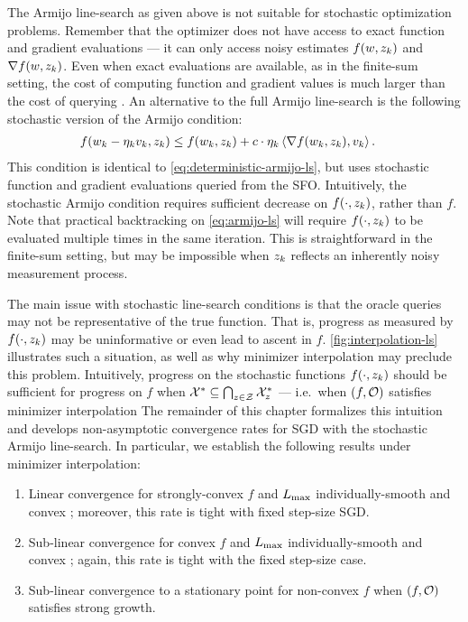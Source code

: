 The Armijo line-search as given above is not suitable for stochastic optimization problems.
Remember that the optimizer does not have access to exact function and gradient evaluations --- it can only access noisy estimates \( f(\w, \zk) \) and \( \grad(\w, \zk) \).
Even when exact evaluations are available, as in the finite-sum setting, the cost of computing function and gradient values is much larger than the cost of querying \oracle{}. 
An alternative to the full Armijo line-search is the following stochastic version of the Armijo condition:
\begin{align}
    f(\wk - \etak v_k, \zk) &\leq f(\wk, \zk) + c \cdot \etak \abr{\grad(\wk, \zk), v_k}. \label{eq:armijo-ls}
\end{align}
This condition is identical to \autoref{eq:deterministic-armijo-ls}, but uses stochastic function and gradient evaluations queried from the \ac{SFO}.
Intuitively, the stochastic Armijo condition requires sufficient decrease on \( f(\cdot, \zk) \), rather than \( f \).
Note that practical backtracking on \autoref{eq:armijo-ls} will require \( f(\cdot, \zk) \) to be evaluated multiple times in the same iteration.
This is straightforward in the finite-sum setting, but may be impossible when \( \zk \) reflects an inherently noisy measurement process. 

The main issue with stochastic line-search conditions is that the oracle queries may not be representative of the true function. 
That is, progress as measured by \( f(\cdot, \zk) \) may be uninformative or even lead to ascent in \( f \). 
\autoref{fig:interpolation-ls} illustrates such a situation, as well as why minimizer interpolation may preclude this problem. 
Intuitively, progress on the stochastic functions \( f(\cdot, \zk) \) should be sufficient for progress on \( f \) when \( \calX^* \subseteq \bigcap_{\z \in \calZ} \calX^*_{\z} \) --- i.e.\ when \( \rbr{f, \oracle{}} \) satisfies minimizer interpolation 
The remainder of this chapter formalizes this intuition and develops non-asymptotic convergence rates for \ac{SGD} with the stochastic Armijo line-search. 
In particular, we establish the following results under minimizer interpolation:
\begin{enumerate}
    \item Linear convergence for strongly-convex \( f \) and \( \Lmax \) individually-smooth and convex \oracle{}; moreover, this rate is tight with fixed step-size \ac{SGD}. 
    \item Sub-linear convergence for convex \( f \) and \( \Lmax \) individually-smooth and convex \oracle{}; again, this rate is tight with the fixed step-size case.
    \item Sub-linear convergence to a stationary point for non-convex \( f \) when \( \rbr{f, \oracle{}} \) satisfies strong growth.
\end{enumerate}

